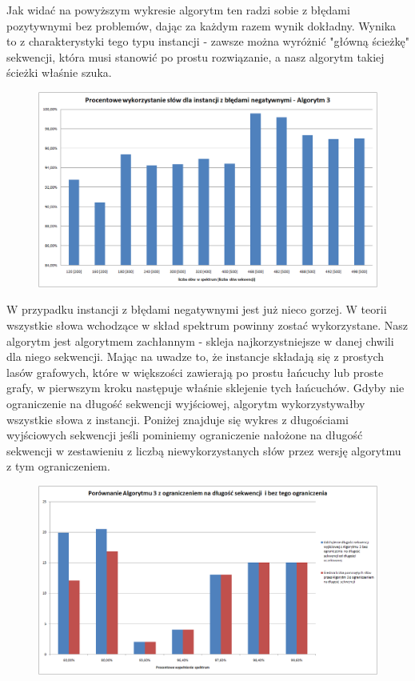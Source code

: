 \documentclass[a4paper,10pt]{article}
\begin{document}
Jak widać na powyższym wykresie algorytm ten radzi sobie z błędami pozytywnymi bez problemów, dając za każdym razem wynik dokładny. Wynika to z charakterystyki tego typu instancji - zawsze można wyróżnić "główną ścieżkę" sekwencji, która musi stanowić po prostu rozwiązanie, a nasz algorytm takiej ścieżki właśnie szuka.

\begin{figure}[h]
  \footnotesize\centering
  \includegraphics[width=\textwidth,keepaspectratio]{percentageUsedWords_general_negative.png}
\end{figure}

W przypadku instancji z błędami negatywnymi jest już nieco gorzej. W teorii wszystkie słowa wchodzące w skład spektrum powinny zostać wykorzystane. Nasz algorytm jest algorytmem zachłannym - skleja najkorzystniejsze w danej chwili dla niego sekwencji. Mając na uwadze to, że instancje składają się z prostych lasów grafowych, które w większości zawierają po prostu łańcuchy lub proste grafy, w pierwszym kroku następuje właśnie sklejenie tych łańcuchów. Gdyby nie ograniczenie na długość sekwencji wyjściowej, algorytm wykorzystywałby wszystkie słowa z instancji. Poniżej znajduje się wykres z długościami wyjściowych sekwencji jeśli pominiemy ograniczenie nałożone na długość sekwencji w zestawieniu z liczbą niewykorzystanych słów przez wersję algorytmu z tym ograniczeniem.

\begin{figure}[h]
  \footnotesize\centering
  \includegraphics[width=\textwidth,keepaspectratio]{withoutNConstraint_general_negative.png}
\end{figure}
\end{document}
